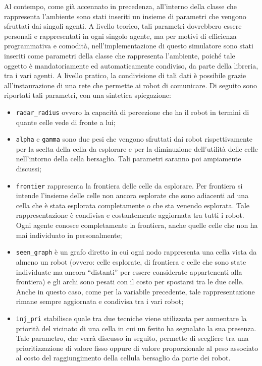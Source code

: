 Al contempo, come già accennato in precedenza, all'interno della classe che rappresenta l'ambiente sono stati inseriti un insieme di parametri che vengono sfruttati dai singoli agenti.
A livello teorico, tali parametri dovrebbero essere personali e rappresentati in ogni singolo agente, ma per motivi di efficienza programmativa e comodità, nell'implementazione di questo simulatore sono stati inseriti come parametri della classe che rappresenta l'ambiente, poiché tale oggetto è mandatoriamente ed automaticamente condiviso, da parte della libreria, tra i vari agenti. A livello pratico, la condivisione di tali dati è possibile grazie all'instaurazione di una rete che permette ai robot di comunicare.
Di seguito sono riportati tali parametri, con una sintetica spiegazione:
\begin{itemize}
	\item \texttt{radar\_radius} ovvero la capacità di percezione che ha il robot in termini di quante celle vede di fronte a lui;
	\item \texttt{alpha} e \texttt{gamma} sono due pesi che vengono sfruttati dai robot rispettivamente per la scelta della cella da esplorare e per la diminuzione dell'utilità delle celle nell'intorno della cella bersaglio. Tali parametri saranno poi ampiamente discussi;
	\item \texttt{frontier} rappresenta la frontiera delle celle da esplorare. Per frontiera si intende l'insieme delle celle non ancora esplorate che sono adiacenti ad una cella che è stata esplorata completamente o che sta venendo esplorata. Tale rappresentazione è condivisa e costantemente aggiornata tra tutti i robot. Ogni agente conosce completamente la frontiera, anche quelle celle che non ha mai individuato in personalmente;
	\item \texttt{seen\_graph} è un grafo diretto in cui ogni nodo rappresenta una cella vista da almeno un robot (ovvero: celle esplorate, di frontiera e celle che sono state individuate ma ancora “distanti” per essere considerate appartenenti alla frontiera) e gli archi sono pesati con il costo per spostarsi tra le due celle. Anche in questo caso, come per la variabile precedente, tale rappresentazione rimane sempre aggiornata e condivisa tra i vari robot;
	\item \texttt{inj\_pri} stabilisce quale tra due tecniche viene utilizzata per aumentare la priorità del vicinato di una cella in cui un ferito ha segnalato la sua presenza. Tale parametro, che verrà discusso in seguito, permette di scegliere tra una prioritizzazione di valore fisso oppure di valore proporzionale al peso associato al costo del raggiungimento della cellula bersaglio da parte dei robot.
\end{itemize}